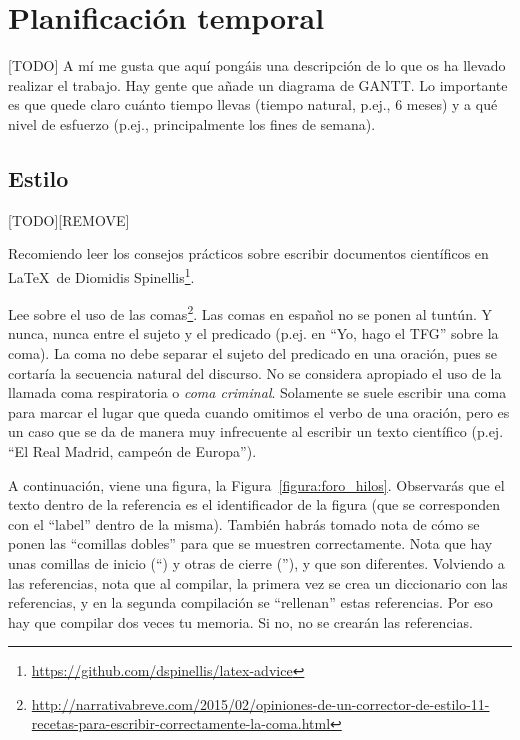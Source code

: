 \documentclass[a4paper, 12pt]{book}
\begin{document}
\section{Planificación temporal}
\label{sec:planificacion-temporal}

[TODO]
A mí me gusta que aquí pongáis una descripción de lo que os ha llevado realizar el trabajo.
Hay gente que añade un diagrama de GANTT.
Lo importante es que quede claro cuánto tiempo llevas (tiempo natural, p.ej., 6 meses) y a qué nivel de esfuerzo (p.ej., principalmente los fines de semana).


\subsection{Estilo}
\label{subsec:estilo}
[TODO][REMOVE]

Recomiendo leer los consejos prácticos sobre escribir documentos científicos en \LaTeX \ de Diomidis Spinellis\footnote{\url{https://github.com/dspinellis/latex-advice}}.

Lee sobre el uso de las comas\footnote{\url{http://narrativabreve.com/2015/02/opiniones-de-un-corrector-de-estilo-11-recetas-para-escribir-correctamente-la-coma.html}}. 
Las comas en español no se ponen al tuntún.
Y nunca, nunca entre el sujeto y el predicado (p.ej. en ``Yo, hago el TFG'' sobre la coma).
La coma no debe separar el sujeto del predicado en una oración, pues se cortaría la secuencia natural del discurso.
No se considera apropiado el uso de la llamada coma respiratoria o \emph{coma criminal}.
Solamente se suele escribir una coma para marcar el lugar que queda cuando omitimos el verbo de una oración, pero es un caso que se da de manera muy infrecuente al escribir un texto científico (p.ej. ``El Real Madrid, campeón de Europa'').

A continuación, viene una figura, la Figura~\ref{figura:foro_hilos}. 
Observarás que el texto dentro de la referencia es el identificador de la figura (que se corresponden con el ``label'' dentro de la misma). 
También habrás tomado nota de cómo se ponen las ``comillas dobles'' para que se muestren correctamente. 
Nota que hay unas comillas de inicio (``) y otras de cierre (''), y que son diferentes.
Volviendo a las referencias, nota que al compilar, la primera vez se crea un diccionario con las referencias, y en la segunda compilación se ``rellenan'' estas referencias. 
Por eso hay que compilar dos veces tu memoria.
Si no, no se crearán las referencias.
\end{document}
